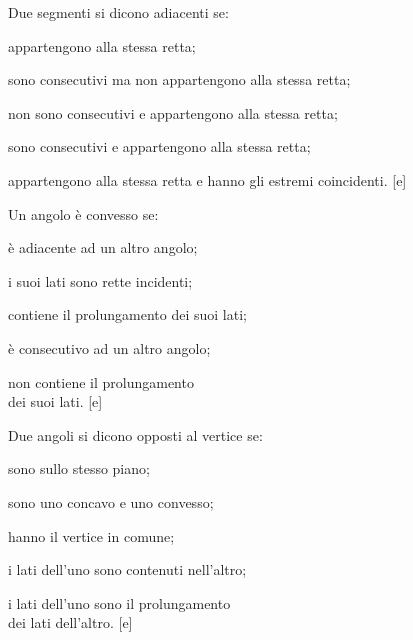 \begin{esercizio}
\label{ese:1.50}
Due segmenti si dicono adiacenti se:
\begin{enumeratea}
\item appartengono alla stessa retta;
\item sono consecutivi ma non appartengono alla stessa retta;
\item non sono consecutivi e appartengono alla stessa retta;
\item sono consecutivi e appartengono alla stessa retta;
\item appartengono alla stessa retta e hanno gli estremi coincidenti.
\hfill[e]
\end{enumeratea}
\end{esercizio}

\begin{esercizio}
\label{ese:1.51}
Un angolo è convesso se:
\begin{multicols}{2}
\begin{enumeratea}
\item è adiacente ad un altro angolo;
\item i suoi lati sono rette incidenti;
\item contiene il prolungamento dei suoi lati;
\item è consecutivo ad un altro angolo;
\item non contiene il prolungamento \\ 
      dei suoi lati.
\hfill[e]
\end{enumeratea}
\end{multicols}
\end{esercizio}


\begin{esercizio}
\label{ese:1.52}
Due angoli si dicono opposti al vertice se:
\begin{multicols}{2}
\begin{enumeratea}
\item sono sullo stesso piano;
\item sono uno concavo e uno convesso;
\item hanno il vertice in comune;
\item i lati dell'uno sono contenuti nell'altro;
\item i lati dell'uno sono il prolungamento \\ 
      dei lati dell'altro.
\hfill[e]
\end{enumeratea}
\end{multicols}
\end{esercizio}

